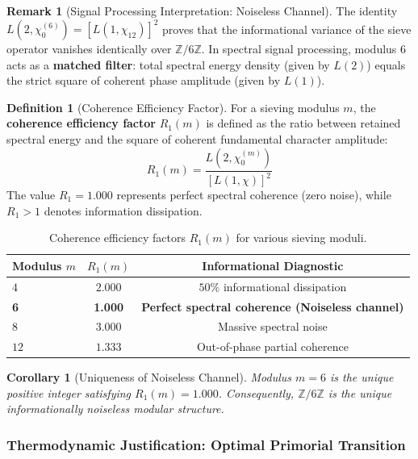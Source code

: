 \documentclass{article}
\numberwithin{equation}{section}
\theoremstyle{plain}
\newtheorem{corollary}[theorem]{Corollary}
\theoremstyle{definition}
\newtheorem{definition}[theorem]{Definition}
\newtheorem{remark}[theorem]{Remark}
\begin{document}
\begin{remark}[Signal Processing Interpretation: Noiseless Channel]
The identity $L(2, \chi_0^{(6)}) = [L(1, \chi_{12})]^2$ proves that the informational variance of the sieve operator vanishes identically over $\mathbb{Z}/6\mathbb{Z}$. In spectral signal processing, modulus 6 acts as a \textbf{matched filter}: total spectral energy density (given by $L(2)$) equals the strict square of coherent phase amplitude (given by $L(1)$).
\end{remark}

\begin{definition}[Coherence Efficiency Factor]
\label{def:R1}
For a sieving modulus $m$, the \textbf{coherence efficiency factor} $R_1(m)$ is defined as the ratio between retained spectral energy and the square of coherent fundamental character amplitude:
\begin{equation}
R_1(m) = \frac{L(2, \chi_0^{(m)})}{\left[ L(1, \chi) \right]^2}
\end{equation}
The value $R_1 = 1.000$ represents perfect spectral coherence (zero noise), while $R_1 > 1$ denotes information dissipation.
\end{definition}

\begin{table}[htbp]
\centering
\caption{Coherence efficiency factors $R_1(m)$ for various sieving moduli.}
\label{tab:R1}
\begin{tabular}{lcc}
\toprule
\textbf{Modulus $m$} & $R_1(m)$ & \textbf{Informational Diagnostic} \\
\midrule
$4$  & $2.000$ & $50\%$ informational dissipation \\
\textbf{6}  & \textbf{1.000} & \textbf{Perfect spectral coherence (Noiseless channel)} \\
$8$  & $3.000$ & Massive spectral noise \\
$12$ & $1.333$ & Out-of-phase partial coherence \\
\bottomrule
\end{tabular}
\end{table}

\begin{corollary}[Uniqueness of Noiseless Channel]
\label{cor:unicidad-R1}
Modulus $m = 6$ is the unique positive integer satisfying $R_1(m) = 1.000$. Consequently, $\mathbb{Z}/6\mathbb{Z}$ is the unique informationally noiseless modular structure.
\end{corollary}

\subsubsection{Thermodynamic Justification: Optimal Primorial Transition}
\end{document}
